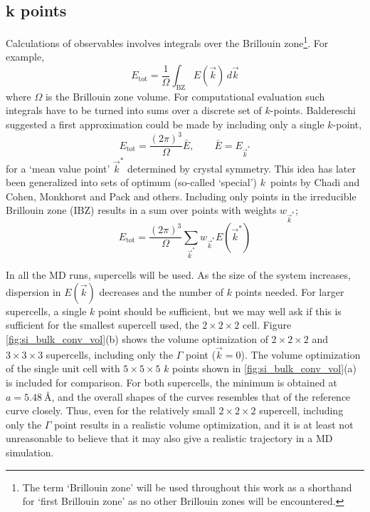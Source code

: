 \documentclass[11pt]{scrbook}   %
\begin{document}
\subsection{k points}

Calculations of observables involves integrals over the Brillouin zone\footnote{The term `Brillouin zone' will be used throughout this work as
a shorthand for `first Brillouin zone' as no other Brillouin zones will be encountered.}. For example,
\begin{equation}
  E_{\text{tot}} = \frac{1}{\Omega} \int_{\text{BZ}} E(\vec{k}) \,d\vec{k}
\end{equation}
where $\Omega$ is the Brillouin zone volume. For computational evaluation such integrals have to be turned into sums over a discrete set of $k$-points. 
Baldereschi suggested a first approximation could be made by including only a single $k$-point,
\begin{equation}
  E_{\text{tot}} = \frac{(2\pi)^3}{\Omega} \bar{E}, \qquad \bar{E}=E_{\vec{k}^*}
\end{equation}
for a `mean value point' $\vec{k}^*$ determined by crystal symmetry\cite{Baldereschi:1973}. 
This idea has later been generalized into sets of optimum (so-called `special') $k$~points by Chadi and Cohen\cite{Chadi:1973},
Monkhorst and Pack\cite{MonkhorstPack:1976} and others.
Including only points in the irreducible Brillouin zone (IBZ) results in a sum over points with weights $w_{\vec{k}^*}$;
\begin{equation}
  E_{\text{tot}} = \frac{(2\pi)^3}{\Omega}\sum_{\vec{k}^*} w_{\vec{k}^*} E(\vec{k}^*)
\end{equation}

In all the MD runs, supercells will be used. As the size of the system increases, dispersion in $E(\vec{k})$ decreases and the number of $k$ points needed.
For larger supercells, a single $k$ point should be sufficient, but we may well ask if this is sufficient for the smallest supercell used, the $2\times2\times2$ cell. 
Figure \ref{fig:si_bulk_conv_vol}(b) shows the volume optimization of $2\times2\times2$ and $3\times3\times3$ supercells,
including only the $\Gamma$ point ($\vec{k}=0$). The volume optimization of the single unit cell with $5\times 5\times5$ $k$ points shown
in \ref{fig:si_bulk_conv_vol}(a) is included for comparison. For both supercells, the minimum is obtained at $a=\SI{5.48}{\angstrom}$,
and the overall shapes of the curves resembles that of the reference curve closely.
Thus, even for the relatively small $2\times 2\times 2$ supercell, including only the $\Gamma$ point results in a realistic volume optimization,
and it is at least not unreasonable to believe that it may also give a realistic trajectory in a MD simulation. 
\end{document}

